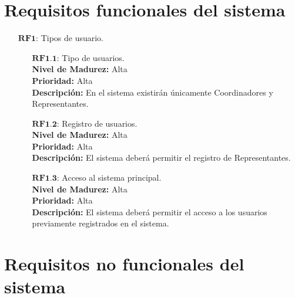 \section{Requisitos funcionales del sistema}

\begin{enumerate}
	\item[$\textbf{RF1:}$] Tipos de usuario.
		\begin{enumerate}
			\item[$\textbf{RF1.1:}$] Tipo de usuarios. \\
				\tab \textbf{Nivel de Madurez:} Alta \\
				\tab \textbf{Prioridad:} Alta  \\
				\tab \textbf{Descripción:} En el sistema existirán únicamente Coordinadores y Representantes. \\
			\item[$\textbf{RF1.2:}$] Registro de usuarios. \\
				\tab \textbf{Nivel de Madurez:} Alta \\
				\tab \textbf{Prioridad:} Alta  \\
				\tab \textbf{Descripción:} El sistema deberá permitir el registro de Representantes. \\
			\item[$\textbf{RF1.3:}$] Acceso al sistema principal. \\
				\tab \textbf{Nivel de Madurez:} Alta \\
				\tab \textbf{Prioridad:} Alta \\
				\tab \textbf{Descripción:} El sistema deberá permitir el acceso a los usuarios previamente registrados en el sistema.
		\end{enumerate}
		
\end{enumerate}
\newpage
\section{Requisitos no funcionales del sistema}

